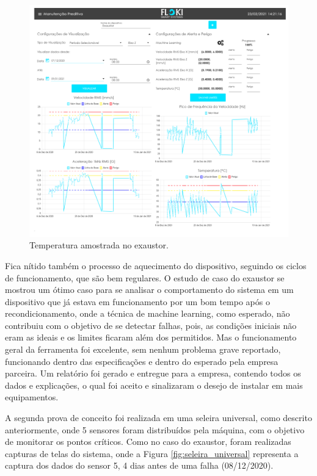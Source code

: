 \begin{figure}[H]
    \caption{Temperatura amostrada no exaustor.}
    \begin{center}
        \includegraphics[scale=0.65, page=3]{resultados/img/resultados.pdf}
    \end{center}
    \label{fig:exaustor_temperatura}
\end{figure}

Fica nítido também o processo de aquecimento do dispositivo, seguindo os ciclos de funcionamento, que são bem regulares. O estudo de caso do 
exaustor se mostrou um ótimo caso para se analisar o comportamento do sistema em um dispositivo que já estava em funcionamento por um bom tempo 
após o recondicionamento, onde a técnica de machine learning, como esperado, não contribuiu com o objetivo de se detectar falhas, pois, as
condições iniciais não eram as ideais e os limites ficaram além dos permitidos. Mas o funcionamento geral da ferramenta foi excelente, sem nenhum
problema grave reportado, funcionando dentro das especificações e dentro do esperado pela empresa parceira. Um relatório foi gerado e entregue
para a empresa, contendo todos os dados e explicações, o qual foi aceito e sinalizaram o desejo de instalar em mais equipamentos.

A segunda prova de conceito foi realizada em uma seleira universal, como descrito anteriormente, onde 5 sensores foram distribuídos pela máquina, com o 
objetivo de monitorar os pontos críticos. Como no caso do exaustor, foram realizadas capturas de telas do sistema, onde a Figura
\ref{fig:seleira_universal} representa a captura dos dados do sensor 5, 4 dias antes de uma falha (08/12/2020). 

